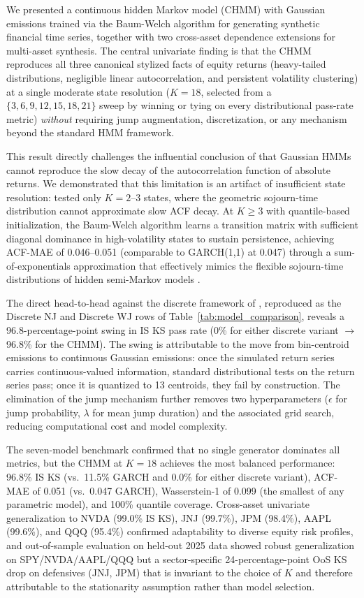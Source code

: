 We presented a continuous hidden Markov model (CHMM) with Gaussian emissions trained via the Baum-Welch algorithm for generating synthetic financial time series, together with two cross-asset dependence extensions for multi-asset synthesis.
The central univariate finding is that the CHMM reproduces all three canonical stylized facts of equity returns (heavy-tailed distributions, negligible linear autocorrelation, and persistent volatility clustering) at a single moderate state resolution ($K = 18$, selected from a $\{3, 6, 9, 12, 15, 18, 21\}$ sweep by winning or tying on every distributional pass-rate metric) \emph{without} requiring jump augmentation, discretization, or any mechanism beyond the standard HMM framework.

This result directly challenges the influential conclusion of \citet{ryden1998stylized} that Gaussian HMMs cannot reproduce the slow decay of the autocorrelation function of absolute returns.
We demonstrated that this limitation is an artifact of insufficient state resolution: \citet{ryden1998stylized} tested only $K = 2$--$3$ states, where the geometric sojourn-time distribution cannot approximate slow ACF decay.
At $K \geq 3$ with quantile-based initialization, the Baum-Welch algorithm learns a transition matrix with sufficient diagonal dominance in high-volatility states to sustain persistence, achieving ACF-MAE of 0.046--0.051 (comparable to GARCH(1,1) at 0.047) through a sum-of-exponentials approximation that effectively mimics the flexible sojourn-time distributions of hidden semi-Markov models \cite{bulla2006stylized}.

The direct head-to-head against the discrete framework of \citet{alswaidan2026hybrid}, reproduced as the Discrete NJ and Discrete WJ rows of Table~\ref{tab:model_comparison}, reveals a 96.8-percentage-point swing in IS KS pass rate (0\% for either discrete variant $\to$ 96.8\% for the CHMM).
The swing is attributable to the move from bin-centroid emissions to continuous Gaussian emissions: once the simulated return series carries continuous-valued information, standard distributional tests on the return series pass; once it is quantized to 13 centroids, they fail by construction.
The elimination of the jump mechanism further removes two hyperparameters ($\epsilon$ for jump probability, $\lambda$ for mean jump duration) and the associated grid search, reducing computational cost and model complexity.

The seven-model benchmark confirmed that no single generator dominates all metrics, but the CHMM at $K = 18$ achieves the most balanced performance: 96.8\% IS KS (vs.\ 11.5\% GARCH and 0.0\% for either discrete variant), ACF-MAE of 0.051 (vs.\ 0.047 GARCH), Wasserstein-1 of 0.099 (the smallest of any parametric model), and 100\% quantile coverage.
Cross-asset univariate generalization to NVDA (99.0\% IS KS), JNJ (99.7\%), JPM (98.4\%), AAPL (99.6\%), and QQQ (95.4\%) confirmed adaptability to diverse equity risk profiles, and out-of-sample evaluation on held-out 2025 data showed robust generalization on SPY/NVDA/AAPL/QQQ but a sector-specific 24-percentage-point OoS KS drop on defensives (JNJ, JPM) that is invariant to the choice of $K$ and therefore attributable to the stationarity assumption rather than model selection.

